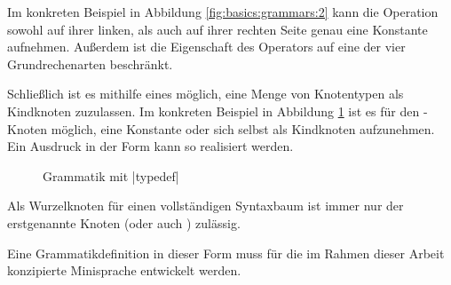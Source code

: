 Im konkreten Beispiel in Abbildung \ref{fig:basics:grammars:2} kann die Operation  sowohl auf ihrer linken, als auch auf ihrer rechten Seite genau eine Konstante aufnehmen. Außerdem ist die Eigenschaft des Operators auf eine der vier Grundrechenarten beschränkt.

Schließlich ist es mithilfe eines  möglich, eine Menge von Knotentypen als Kindknoten zuzulassen. Im konkreten Beispiel in Abbildung \ref{fig:basics:grammars:3} ist es für den -Kno\-ten möglich, eine Konstante oder sich selbst als Kindknoten aufzunehmen. Ein Ausdruck in der Form  kann so realisiert werden.

\begin{figure}[h]
  
  \caption{Grammatik mit \inlinec|typedef|}
  \label{fig:basics:grammars:3}
\end{figure}

Als Wurzelknoten für einen vollständigen Syntaxbaum ist immer nur der erstgenannte Knoten (oder auch ) zulässig.

Eine Grammatikdefinition in dieser Form muss für die im Rahmen dieser Arbeit konzipierte Minisprache entwickelt werden.
